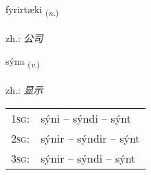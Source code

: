 \documentclass[frontgrid, backgrid]{flacards}\usepackage[]{graphicx}\usepackage[]{xcolor}
\begin{document}
\renewcommand{\flhead}{\vskip5pt \fboxsep=0pt {\small\bfseries\footnotesize Nafnorð | 名词}}
\renewcommand{\fcfoot}{\vskip5pt \fboxsep=0pt \hspace{2pt}{\small\bfseries\footnotesize 1K}}

\renewcommand{\blhead}{\vskip5pt {\small\bfseries\footnotesize Nafnorð | 名词 }}
\renewcommand{\bcfoot}{\vskip5pt \hspace{2pt}{\small\bfseries\footnotesize 1K}}


{fyrirtæki \small{\textsubscript{(\textit{n.})}} \\[1ex] %
 \\
zh.: \emph{公司} \\  [2ex]
\renewcommand*{\arraystretch}{0.8}
}

\renewcommand{\flhead}{\vskip5pt \fboxsep=0pt {\small\bfseries\footnotesize Sagnorð | 动词}}
\renewcommand{\fcfoot}{\vskip5pt \fboxsep=0pt \hspace{2pt}{\small\bfseries\footnotesize 1K}}

\renewcommand{\blhead}{\vskip5pt {\small\bfseries\footnotesize Sagnorð | 动词 }}
\renewcommand{\bcfoot}{\vskip5pt \hspace{2pt}{\small\bfseries\footnotesize 1K}}


{sýna \small{\textsubscript{(\textit{v.})}} \\[1ex] %
\textphonetic{[siːna]} \\
zh.: \emph{显示} \\  [2ex]
\renewcommand*{\arraystretch}{0.8}
\begin{tabular}{p{1cm}l}
\textsc{1sg}: & sýni -- sýndi -- sýnt \\ 
\textsc{2sg}: & sýnir -- sýndir -- sýnt \\ 
\textsc{3sg}: & sýnir -- sýndi -- sýnt \\ 
\end{tabular}
}
\end{document}
